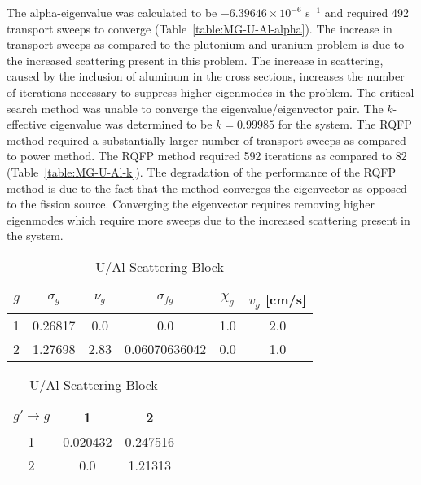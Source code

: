 The alpha-eigenvalue was calculated to be $-6.39646 \times 10^{-6}$ s$^{-1}$ and required 492 transport sweeps to converge (Table~\ref{table:MG-U-Al-alpha}). The increase in transport sweeps as compared to the plutonium and uranium problem is due to the increased scattering present in this problem. The increase in scattering, caused by the inclusion of aluminum in the cross sections, increases the number of iterations necessary to suppress higher eigenmodes in the problem. The critical search method was unable to converge the eigenvalue/eigenvector pair. The $k$-effective eigenvalue was determined to be $k=0.99985$ for the system. The RQFP method required a substantially larger number of transport sweeps as compared to power method. The RQFP method required 592 iterations as compared to 82 (Table~\ref{table:MG-U-Al-k}). The degradation of the performance of the RQFP method is due to the fact that the method converges the eigenvector as opposed to the fission source. Converging the eigenvector requires removing higher eigenmodes which require more sweeps due to the increased scattering present in the system. 

\begin{table}[!htbp]
	\caption{Two-Group U/Al Problem Cross Sections (cm$^{-1}$)}
	\label{table:U-Al}
	\begin{subtable}[!htbp]{1.0\textwidth}
		\centering{}
		\begin{tabular}{@{}cccccc@{}}\toprule
			$g$ & $\sigma_{g} $ & $\nu_{g}$ & $\sigma_{fg}$ & $\chi_{g}$ & $v_{g}$ [cm/s] \\ 
        			\midrule
			1 & 0.26817 & 0.0 & 0.0 & 1.0 & 2.0 \\
			2 & 1.27698 & 2.83 & 0.06070636042 & 0.0 & 1.0 \\
			\bottomrule
		\end{tabular}
	\caption{U/Al Cross Sections}
	\label{table:TwoGroupU-Al}
	\end{subtable}%
	\vspace{0.25cm}
	\begin{subtable}[!htbp]{1.0\textwidth}
	\centering{}
	\begin{tabular}{@{}ccc@{}}\toprule
	$g' \rightarrow g$ & 1 & 2 \\ 
        \midrule
	1 & 0.020432 & 0.247516  \\
	2 & 0.0 & 1.21313 \\
	\bottomrule
	\end{tabular}
	\caption{U/Al Scattering Block}
	\label{table:TwoGroupU-Al_ScatterXS}
	\end{subtable}
\end{table}

